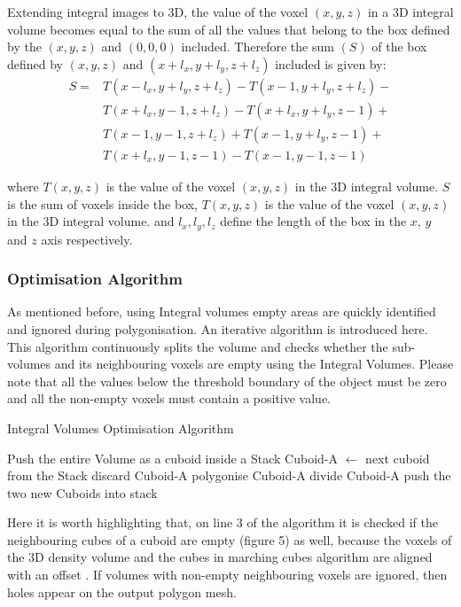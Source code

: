 \documentclass{subfiles}
\begin{document}
Extending integral images to 3D, the value of the voxel $(x ,y, z)$ in a 3D integral volume becomes equal to the sum of all the values that belong to the box defined by the $(x, y, z)$ and $(0, 0, 0)$ included. 
Therefore the sum $(S)$ of the box defined by $(x, y, z)$ and $(x+l_x, y+l_y, z+l_z)$ included is given by:
\begin{equation}
\begin{split}
S = & T(x-l_x,y+l_y,z+l_z) - 
T(x-1,y+l_y,z+l_z) - \\
&  T(x+l_x,y-1,z+l_z) - 	
T(x+l_x,y+l_y,z-1) + \\
&  T(x-1,y-1,z+l_z)   +
T(x-1,y+l_y,z-1)   +  \\
&  T(x+l_x,y-1,z-1)   -
T(x-1,y-1,z-1)
\end{split}
\end{equation}

where 	$T(x, y, z)$ is the value of the voxel $(x, y, z)$ in the 3D integral volume.  
$S$ is the sum of voxels inside the box, $T(x, y, z)$ is the value of the voxel $(x, y, z)$ in the 3D integral volume. and $l_x, l_y, l_z$ define the length of the box in the $x$, $y$ and $z$ axis respectively. 



\subsubsection{Optimisation Algorithm}\label{sec:IVoptApproach}
As mentioned before, using Integral volumes empty areas are quickly identified and ignored during polygonisation. An iterative algorithm is introduced here. This algorithm continuously splits the volume and checks whether the sub-volumes and its neighbouring voxels are empty using the Integral Volumes. Please note that all the values below the threshold boundary of the object must be zero and all the non-empty voxels must contain a positive value.  

\begin{algorithm}
	\caption{Integral Volumes Optimisation Algorithm}
	\label{alg:IVoptSimple}
	\centering
	\begin{algorithmic}[1]
		\STATE Push the entire Volume as a cuboid inside a Stack
		\STATE Cuboid-A   $\gets$  next cuboid from the Stack 
		\STATE	discard Cuboid-A
		\STATE polygonise Cuboid-A
		\ELSE 
		\STATE divide Cuboid-A
		\STATE push the two new Cuboids into stack
		\ENDIF
		\ENDWHILE
	\end{algorithmic}
\end{algorithm}
Here it is worth highlighting that, on line 3 of the algorithm it is checked if the neighbouring cubes of a cuboid are empty (figure 5) as well, because the voxels of the 3D density volume and the cubes in marching cubes algorithm are  aligned with an offset \cite{Miltiadou2015}. If volumes with non-empty neighbouring voxels are ignored, then holes appear on the output polygon mesh. 		
\end{document}
